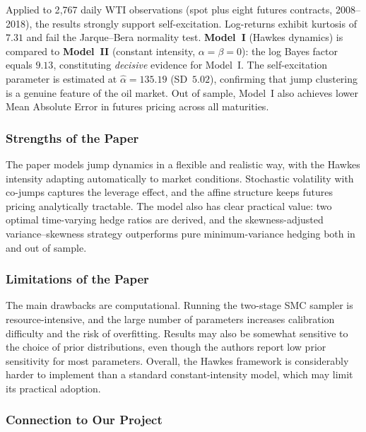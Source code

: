 \documentclass[12pt,a4paper]{article}
\begin{document}
Applied to 2{,}767 daily WTI observations (spot plus eight
futures contracts, 2008--2018), the results strongly support
self-excitation. Log-returns exhibit kurtosis of $7.31$ and fail
the Jarque--Bera normality test. \textbf{Model~I} (Hawkes
dynamics) is compared to \textbf{Model~II} (constant intensity,
$\alpha=\beta=0$): the log Bayes factor equals $9.13$,
constituting \textit{decisive} evidence for Model~I. The
self-excitation parameter is estimated at $\hat{\alpha}=135.19$
(SD~$5.02$), confirming that jump clustering is a genuine feature
of the oil market. Out of sample, Model~I also achieves lower
Mean Absolute Error in futures pricing across all maturities.

\subsubsection*{Strengths of the Paper}

The paper models jump dynamics in a flexible and realistic way,
with the Hawkes intensity adapting automatically to market
conditions. Stochastic volatility with co-jumps captures the
leverage effect, and the affine structure keeps futures pricing
analytically tractable. The model also has clear practical value:
two optimal time-varying hedge ratios are derived, and the
skewness-adjusted variance--skewness strategy outperforms pure
minimum-variance hedging both in and out of sample.

\subsubsection*{Limitations of the Paper}

The main drawbacks are computational. Running the two-stage SMC
sampler is resource-intensive, and the large number of parameters
increases calibration difficulty and the risk of overfitting.
Results may also be somewhat sensitive to the choice of prior
distributions, even though the authors report low prior
sensitivity for most parameters. Overall, the Hawkes framework
is considerably harder to implement than a standard
constant-intensity model, which may limit its practical adoption.

\subsubsection*{Connection to Our Project}
\end{document}
